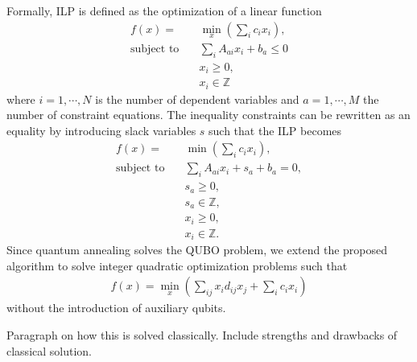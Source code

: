 \documentclass[prd,twocolumn,tightenlines,preprintnumbers,showpacs,superscriptaddress,notitlepage,nofootinbib,eqsecnum,floatfix,longbibliography]{revtex4}
\begin{document}
Formally, ILP is defined as the optimization of a linear function
{\color{blue}
\begin{align}
    f(x) = &\min\limits_{x}(\sum_i c_i x_i),\\
    \textrm{subject to} \quad & \sum_i A_{ai}x_i +b_a \leq 0 \\
    & x_i \geq 0,\\
    & x_i \in \mathbb{Z}
\end{align}
}
where $i=1, \cdots,  N$ is the number of dependent variables and $a=1, \cdots, M$ the number of constraint equations.
The inequality constraints can be rewritten as an equality by introducing slack variables $s$ such that the ILP becomes
{\color{blue}
\begin{align}
    f(x) = &\min(\sum_i c_i x_i),\\
    \textrm{subject to} \quad & \sum_i A_{a i}x_i + s_a + b_a = 0,\\
    & s_a \geq 0,\\
    & s_a \in \mathbb{Z},\\
    & x_i \geq 0,\\
    & x_i \in \mathbb{Z}.
\end{align}
}
Since quantum annealing solves the QUBO problem, we extend the proposed algorithm to solve integer quadratic optimization problems such that
{\color{blue}
\begin{align}
    f(x) = \min\limits_{x}(\sum_{ij} x_i d_{ij} x_j + \sum_i c_i x_i)
\end{align}
}
without the introduction of auxiliary qubits.

{\color{red} Paragraph on how this is solved classically.
Include strengths and drawbacks of classical solution.}
\end{document}
